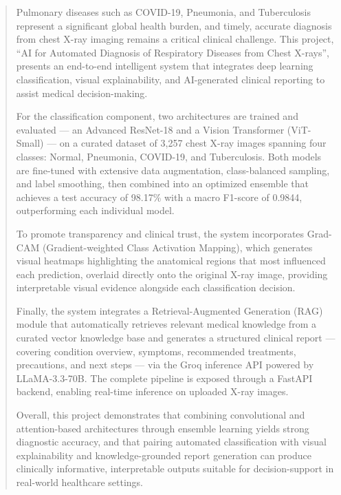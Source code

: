 \documentclass[12pt]{report}
\begin{document}
\frontmatter


\setcounter{page}{1}
\begin{abstract}

Pulmonary diseases such as COVID-19, Pneumonia, and Tuberculosis represent a significant global health burden, and timely, accurate diagnosis from chest X-ray imaging remains a critical clinical challenge. This project, ``AI for Automated Diagnosis of Respiratory Diseases from Chest X-rays'', presents an end-to-end intelligent system that integrates deep learning classification, visual explainability, and AI-generated clinical reporting to assist medical decision-making.

For the classification component, two architectures are trained and evaluated --- an Advanced ResNet-18 and a Vision Transformer (ViT-Small) --- on a curated dataset of 3,257 chest X-ray images spanning four classes: Normal, Pneumonia, COVID-19, and Tuberculosis. Both models are fine-tuned with extensive data augmentation, class-balanced sampling, and label smoothing, then combined into an optimized ensemble that achieves a test accuracy of 98.17\% with a macro F1-score of 0.9844, outperforming each individual model.

To promote transparency and clinical trust, the system incorporates Grad-CAM (Gradient-weighted Class Activation Mapping), which generates visual heatmaps highlighting the anatomical regions that most influenced each prediction, overlaid directly onto the original X-ray image, providing interpretable visual evidence alongside each classification decision.

Finally, the system integrates a Retrieval-Augmented Generation (RAG) module that automatically retrieves relevant medical knowledge from a curated vector knowledge base and generates a structured clinical report --- covering condition overview, symptoms, recommended treatments, precautions, and next steps --- via the Groq inference API powered by LLaMA-3.3-70B. The complete pipeline is exposed through a FastAPI backend, enabling real-time inference on uploaded X-ray images.

Overall, this project demonstrates that combining convolutional and attention-based architectures through ensemble learning yields strong diagnostic accuracy, and that pairing automated classification with visual explainability and knowledge-grounded report generation can produce clinically informative, interpretable outputs suitable for decision-support in real-world healthcare settings.
\end{abstract}
\end{document}

